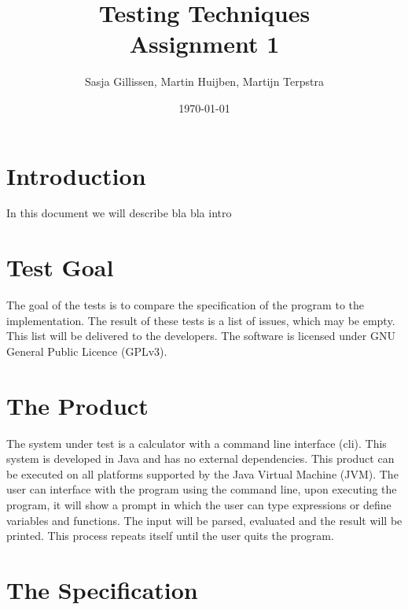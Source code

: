 \documentclass[11pt,a4paper]{article}
\author{Sasja Gillissen, Martin Huijben, Martijn Terpstra}
\date{\today}
\title{Testing Techniques\\
  \textbf{Assignment 1}}
\begin{document}
\maketitle

\section{Introduction}
In this document we will describe
bla bla intro

\section{Test Goal}
The goal of the tests is to compare the specification of the program to the implementation. The result of these tests is a list of issues, which may be empty. This list will be delivered to the developers. The software is licensed under GNU General Public Licence (GPLv3).


\section{The Product}
The system under test is a calculator with a command line interface (cli). This system is developed in Java and has no external dependencies. This product can be executed on all platforms supported by the Java Virtual Machine (JVM). The user can interface with the program using the command line, upon executing the program, it will show a prompt in which the user can type expressions or define variables and functions. The input will be parsed, evaluated and the result will be printed. This process repeats itself until the user quits the program.


\section{The Specification}
\end{document}
